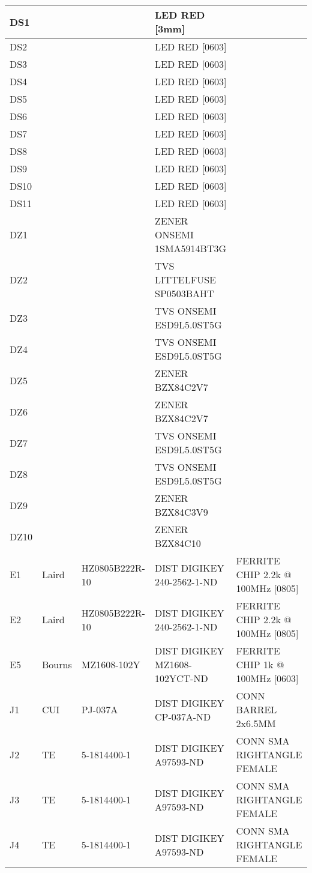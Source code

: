 \begin{longtable}{|l|l|l|l|l|}
\hline
DS1 &  &  & LED RED [3mm] &  \\
\hline
DS2 &  &  & LED RED [0603] &  \\
\hline
DS3 &  &  & LED RED [0603] &  \\
\hline
DS4 &  &  & LED RED [0603] &  \\
\hline
DS5 &  &  & LED RED [0603] &  \\
\hline
DS6 &  &  & LED RED [0603] &  \\
\hline
DS7 &  &  & LED RED [0603] &  \\
\hline
DS8 &  &  & LED RED [0603] &  \\
\hline
DS9 &  &  & LED RED [0603] &  \\
\hline
DS10 &  &  & LED RED [0603] &  \\
\hline
DS11 &  &  & LED RED [0603] &  \\
\hline
DZ1 &  &  & ZENER ONSEMI 1SMA5914BT3G &  \\
\hline
DZ2 &  &  & TVS LITTELFUSE SP0503BAHT &  \\
\hline
DZ3 &  &  & TVS ONSEMI ESD9L5.0ST5G &  \\
\hline
DZ4 &  &  & TVS ONSEMI ESD9L5.0ST5G &  \\
\hline
DZ5 &  &  & ZENER BZX84C2V7 &  \\
\hline
DZ6 &  &  & ZENER BZX84C2V7 &  \\
\hline
DZ7 &  &  & TVS ONSEMI ESD9L5.0ST5G &  \\
\hline
DZ8 &  &  & TVS ONSEMI ESD9L5.0ST5G &  \\
\hline
DZ9 &  &  & ZENER BZX84C3V9 &  \\
\hline
DZ10 &  &  & ZENER BZX84C10 &  \\
\hline
E1 & Laird & HZ0805B222R-10 & DIST DIGIKEY 240-2562-1-ND & FERRITE CHIP 2.2k @ 100MHz [0805] \\
\hline
E2 & Laird & HZ0805B222R-10 & DIST DIGIKEY 240-2562-1-ND & FERRITE CHIP 2.2k @ 100MHz [0805] \\
\hline
E5 & Bourns & MZ1608-102Y & DIST DIGIKEY MZ1608-102YCT-ND & FERRITE CHIP 1k @ 100MHz [0603] \\
\hline
J1 & CUI & PJ-037A & DIST DIGIKEY CP-037A-ND & CONN BARREL 2x6.5MM \\
\hline
J2 & TE & 5-1814400-1 & DIST DIGIKEY A97593-ND & CONN SMA RIGHTANGLE FEMALE \\
\hline
J3 & TE & 5-1814400-1 & DIST DIGIKEY A97593-ND & CONN SMA RIGHTANGLE FEMALE \\
\hline
J4 & TE & 5-1814400-1 & DIST DIGIKEY A97593-ND & CONN SMA RIGHTANGLE FEMALE \\

\end{longtable}
